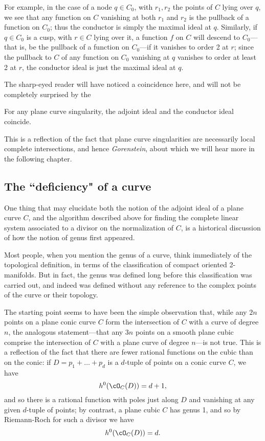 For example, in the case of a node $q \in C_0$, with $r_1,r_2$ the points of $C$ lying over $q$, we see that any function on $C$ vanishing at both $r_1$ and $r_2$ is the pullback of a function on $C_0$; thus the conductor is simply the maximal ideal at $q$. Similarly, if $q \in C_0$ is a cusp, with $r \in C$ lying over it, a function $f$ on $C$ will descend to $C_0$---that is, be the pullback of a function on $C_0$---if it vanishes to order 2 at $r$; since the pullback to $C$ of any function on $C_0$ vanishing at $q$ vanishes to order at least 2 at $r$, the conductor ideal is just the maximal ideal at $q$.

The sharp-eyed reader will have noticed a coincidence here, and will not be completely surprised by the

\begin{theorem}
For any plane curve singularity, the adjoint ideal and the conductor ideal coincide.
\end{theorem}

This is a reflection of the fact that plane curve singularities are necessarily local complete intersections, and hence \emph{Gorenstein}, about which we will hear more in the following chapter.

\subsection{The ``deficiency" of a curve}

One thing that may elucidate both the notion of the adjoint ideal of a plane curve $C$, and the algorithm described above for finding the complete linear system associated to a divisor on the normalization of $C$, is a historical discussion of how the notion of genus first appeared.

Most people, when you mention the genus of a curve, think immediately of the topological definition, in terms of the classification of compact oriented 2-manifolds. But in fact, the genus was defined long before this classification was carried out, and indeed was defined without any reference to the complex points of the curve or their topology.

The starting point seems to have been the simple observation that, while any $2n$ points on a plane conic curve $C$ form the intersection of $C$ with a  curve of degree $n$, the analogous statement---that any $3n$ points on a smooth plane cubic comprise the intersection of $C$ with a plane curve of degree $n$---is not true. This is a reflection of the fact that there are fewer rational functions on the cubic than on the conic: if $D = p_1+\dots + p_d$ is a $d$-tuple of points on a conic curve $C$, we have
$$
h^0(\cO_C(D)) = d+1,
$$ 
and so there is a rational function with poles just along $D$ and vanishing at any given $d$-tuple of points; by contrast, a plane cubic $C$ has genus 1, and so by Riemann-Roch for such a divisor we have
$$
h^0(\cO_C(D)) = d.
$$

